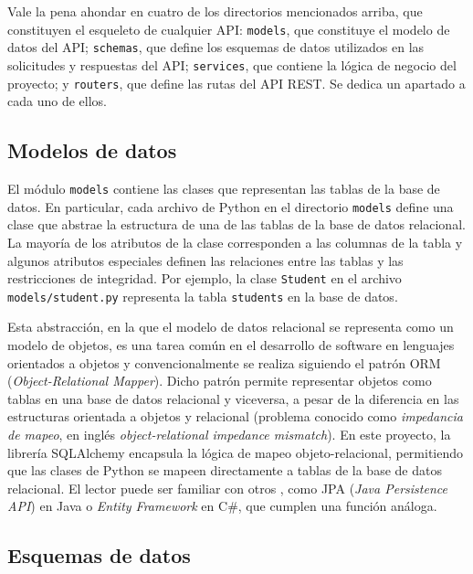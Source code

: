 Vale la pena ahondar en cuatro de los directorios mencionados arriba, que constituyen el esqueleto de cualquier \gls{API}: \texttt{models}, que constituye el modelo de datos del \gls{API}; \texttt{schemas}, que define los esquemas de datos utilizados en las solicitudes y respuestas del \gls{API}; \texttt{services}, que contiene la lógica de negocio del proyecto; y \texttt{routers}, que define las rutas del \gls{API REST}. Se dedica un apartado a cada uno de ellos.

\subsection{Modelos de datos}

El módulo \texttt{models} contiene las clases que representan las tablas de la base de datos. En particular, cada archivo de \gls{Python} en el directorio \texttt{models} define una clase que abstrae la estructura de una de las tablas de la base de datos relacional. La mayoría de los atributos de la clase corresponden a las columnas de la tabla y algunos atributos especiales definen las relaciones entre las tablas y las restricciones de integridad. Por ejemplo, la clase \texttt{Student} en el archivo \texttt{models/student.py} representa la tabla \texttt{students} en la base de datos.

Esta abstracción, en la que el modelo de datos relacional se representa como un modelo de objetos, es una tarea común en el desarrollo de software en lenguajes orientados a objetos y convencionalmente se realiza siguiendo el patrón \gls{ORM} (\textit{Object-Relational Mapper}). Dicho patrón permite representar objetos como tablas en una base de datos relacional y viceversa, a pesar de la diferencia en las estructuras orientada a objetos y relacional (problema conocido como \textit{impedancia de mapeo}, en inglés \textit{object-relational impedance mismatch}). En este proyecto, la librería \gls{SQLAlchemy} encapsula la lógica de mapeo objeto-relacional, permitiendo que las clases de \gls{Python} se mapeen directamente a tablas de la base de datos relacional. El lector puede ser familiar con otros , como JPA (\textit{Java Persistence API}) en Java o \textit{Entity Framework} en C\#, que cumplen una función análoga.

\subsection{Esquemas de datos}
\label{subsec:schemas}

